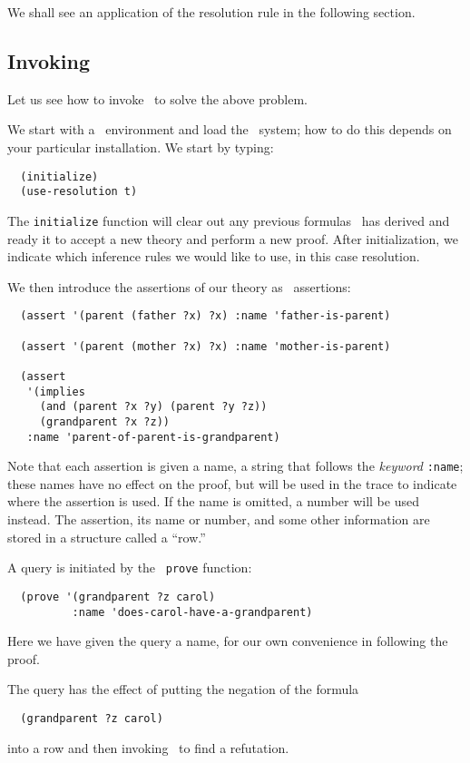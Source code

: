 We shall see an application of the resolution rule in the following
section.
\subsection{Invoking \Snark }
\label{subsec-invoking-snark}
Let us see how to invoke \snark\  to solve the above problem.

We start with a \lisp\  environment and load the \snark\  system; how to
do this depends on your particular installation.  We start by typing:
\begin{verbatim}
  (initialize)
  (use-resolution t)
\end{verbatim}
The {\tt initialize} function will clear out any previous
formulas \snark\  has derived and ready it to accept a new theory and
perform a new proof.  After initialization, we indicate which
inference rules we would like to use, in this case resolution.

We then introduce the assertions of our theory as \snark\  assertions:
\begin{verbatim}
  (assert '(parent (father ?x) ?x) :name 'father-is-parent)

  (assert '(parent (mother ?x) ?x) :name 'mother-is-parent)

  (assert
   '(implies
     (and (parent ?x ?y) (parent ?y ?z))
     (grandparent ?x ?z))
   :name 'parent-of-parent-is-grandparent)
\end{verbatim}
Note that each assertion is given a name, a string that follows the {\em
keyword} {\tt :name}; these names have no effect on the proof, but will be
used in the trace to indicate where the assertion is used.  If the name is
omitted, a number will be used instead.  The assertion, its name or number,
and some other information are stored in a structure called a ``row.''

A query is initiated by the \snark\ {\tt prove} function:
\begin{verbatim}
  (prove '(grandparent ?z carol)
          :name 'does-carol-have-a-grandparent)
\end{verbatim}
Here we have given the query a name, for our own convenience in
following the proof.

The query has the effect of putting the negation of the formula
\begin{verbatim}
  (grandparent ?z carol)
\end{verbatim}
into a row and then invoking \snark\  to find a refutation.

